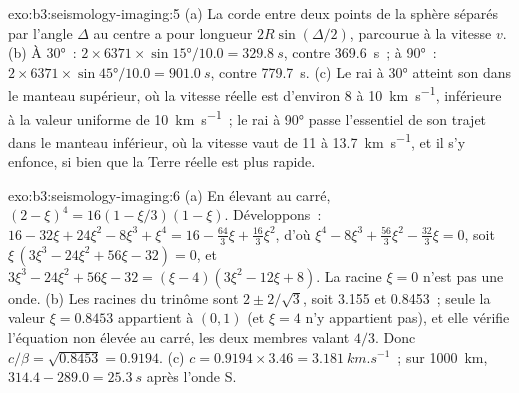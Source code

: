 \begin{solution}{exo:b3:seismology-imaging:5}
(a) La corde entre deux points de la sphère séparés par l'angle $\Delta$
au centre a pour longueur $2R\sin(\Delta/2)$, parcourue à la vitesse $v$.
(b) À \ang{30}~: $2\times6371\times\sin\ang{15}/10.0 = \qty{329.8}{s}$, contre
\qty{369.6}{s}~; à \ang{90}~: $2\times6371\times\sin\ang{45}/10.0 =
\qty{901.0}{s}$, contre \qty{779.7}{s}. (c) Le rai à \ang{30} atteint son 
dans le manteau supérieur, où la vitesse réelle est d'environ 8 à \qty{10}{km.s^{-1}}, inférieure à la
valeur uniforme de \qty{10}{km.s^{-1}}~; le rai à \ang{90} passe l'essentiel de son trajet dans le
manteau inférieur, où la vitesse vaut de 11 à \qty{13.7}{km.s^{-1}}, et il s'y enfonce, si bien que la
Terre réelle est plus rapide.
\end{solution}

\begin{solution}{exo:b3:seismology-imaging:6}
(a) En élevant au carré, $(2 - \xi)^4 = 16(1 - \xi/3)(1 - \xi)$. Développons~:
$16 - 32\xi + 24\xi^2 - 8\xi^3 + \xi^4 = 16 - \tfrac{64}{3}\xi + \tfrac{16}{3}\xi^2$,
d'où $\xi^4 - 8\xi^3 + \tfrac{56}{3}\xi^2 - \tfrac{32}{3}\xi = 0$, soit
$\xi\,(3\xi^3 - 24\xi^2 + 56\xi - 32) = 0$, et
$3\xi^3 - 24\xi^2 + 56\xi - 32 = (\xi - 4)(3\xi^2 - 12\xi + 8)$. La racine
$\xi = 0$ n'est pas une onde. (b) Les racines du trinôme sont $2 \pm 2/\sqrt3$,
soit 3.155 et 0.8453~; seule la valeur $\xi = 0.8453$ appartient à $(0, 1)$ (et $\xi = 4$
n'y appartient pas), et elle vérifie l'équation non élevée au carré, les deux membres valant $4/3$.
Donc $c/\beta = \sqrt{0.8453} = 0.9194$. (c) $c = 0.9194\times3.46 =
\qty{3.181}{km.s^{-1}}$~; sur \qty{1000}{km}, $314.4 - 289.0 = \qty{25.3}{s}$
après l'onde S.
\end{solution}


